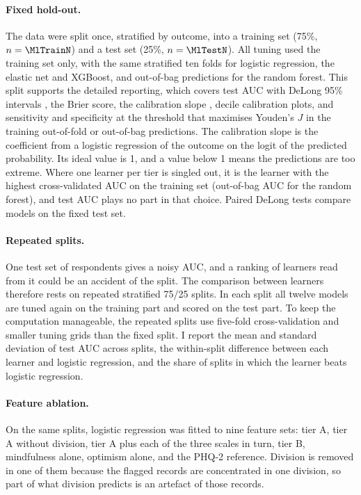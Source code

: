 \paragraph{Fixed hold-out.} The data were split once, stratified by outcome, into a training set (75\%, $n = \MlTrainN$) and a test set (25\%, $n = \MlTestN$). All tuning used the training set only, with the same stratified ten folds for logistic regression, the elastic net and XGBoost, and out-of-bag predictions for the random forest. This split supports the detailed reporting, which covers test AUC with DeLong 95\% intervals \parencite{delong1988,robin2011}, the Brier score, the calibration slope \parencite{vancalster2019}, decile calibration plots, and sensitivity and specificity at the threshold that maximises Youden's $J$ \parencite{youden1950} in the training out-of-fold or out-of-bag predictions. The calibration slope is the coefficient from a logistic regression of the outcome on the logit of the predicted probability. Its ideal value is 1, and a value below 1 means the predictions are too extreme. Where one learner per tier is singled out, it is the learner with the highest cross-validated AUC on the training set (out-of-bag AUC for the random forest), and test AUC plays no part in that choice. Paired DeLong tests compare models on the fixed test set.

\paragraph{Repeated splits.} One test set of \MlTestN{} respondents gives a noisy AUC, and a ranking of learners read from it could be an accident of the split. The comparison between learners therefore rests on \RepN{} repeated stratified 75/25 splits. In each split all twelve models are tuned again on the training part and scored on the test part. To keep the computation manageable, the repeated splits use five-fold cross-validation and smaller tuning grids than the fixed split. I report the mean and standard deviation of test AUC across splits, the within-split difference between each learner and logistic regression, and the share of splits in which the learner beats logistic regression.

\paragraph{Feature ablation.} On the same \RepN{} splits, logistic regression was fitted to nine feature sets: tier A, tier A without division, tier A plus each of the three scales in turn, tier B, mindfulness alone, optimism alone, and the PHQ-2 reference. Division is removed in one of them because the flagged records are concentrated in one division, so part of what division predicts is an artefact of those records.

